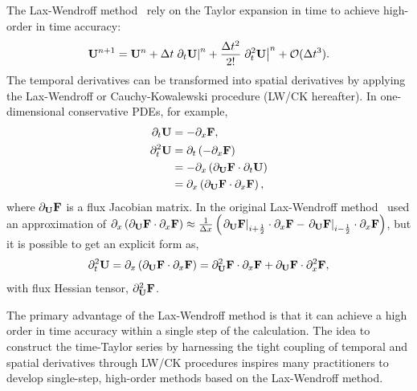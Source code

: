 The Lax-Wendroff method~\cite{lax1959systems} rely on the Taylor expansion in time
to achieve high-order in time accuracy:
\begin{equation}\label{eq:lw_time_taylor}
    \mathbf{U}^{n + 1} = \mathbf{U}^{n} + \Delta t \left. \partial_{t} \mathbf{U} \right|^{n} + \frac{\Delta t^{2}}{2!} \left.\partial^{2}_{t} \mathbf{U}\right|^{n} + \mathcal{O}(\Delta t^{3}).
\end{equation}
The temporal derivatives can be transformed into spatial derivatives
by applying the Lax-Wendroff or Cauchy-Kowalewski procedure (LW/CK hereafter).
In one-dimensional conservative PDEs, for example,
\begin{equation}\label{eq:lw_1d_ck_procedure}
    \begin{split}
        \partial_{t} \mathbf{U} &= -\partial_{x} \mathbf{F}, \\
        \partial^{2}_{t} \mathbf{U} &= \partial_{t} \left( -\partial_{x} \mathbf{F}\right) \\
                     &= -\partial_{x} \left( \partial_{\mathbf{U}} \mathbf{F} \cdot \partial_{t} \mathbf{U} \right) \\
                     &= \partial_{x} \left( \partial_{\mathbf{U}} \mathbf{F} \cdot \partial_{x} \mathbf{F} \right),
    \end{split}
\end{equation}
where \( \partial_{\mathbf{U}} \mathbf{F} \) is a flux Jacobian matrix.
In the original Lax-Wendroff method~\cite{lax1959systems} used an approximation of \( \partial_{x} \left( \partial_{\mathbf{U}} \mathbf{F} \cdot \partial_{x} \mathbf{F} \right) \approx
\frac{1}{\Delta x}\left( \left.\partial_{\mathbf{U}} \mathbf{F} \right|_{{i+\frac{1}{2}}} \cdot \partial_{x} \mathbf{F} - \left.\partial_{\mathbf{U}} \mathbf{F} \right|_{{i-\frac{1}{2}}} \cdot \partial_{x} \mathbf{F} \right) \),
but it is possible to get an explicit form as,
\begin{equation}\label{}
    \partial^{2}_{t} \mathbf{U} = \partial_{x} \left( \partial_{\mathbf{U}} \mathbf{F} \cdot \partial_{x} \mathbf{F} \right) = \partial^{2}_{\mathbf{U}} \mathbf{F} \cdot \partial_{x} \mathbf{F} + \partial_{\mathbf{U}} \mathbf{F} \cdot \partial^{2}_{x} \mathbf{F},
\end{equation}
with flux Hessian tensor, \( \partial^{2}_{\mathbf{U}} \mathbf{F} \).

The primary advantage of the Lax-Wendroff method is that
it can achieve a high order in time accuracy within a single step of the calculation.
The idea to construct the time-Taylor series by harnessing the tight coupling of temporal
and spatial derivatives through LW/CK procedures inspires many practitioners
to develop single-step, high-order methods based on the Lax-Wendroff method.

